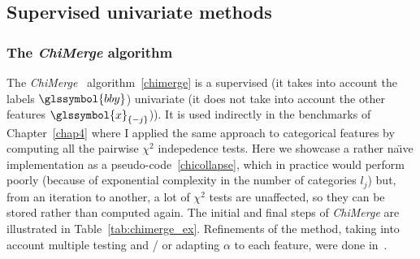 \subsection{Supervised univariate methods}

\subsubsection{The \textit{ChiMerge} algorithm}

The \textit{ChiMerge}~\cite{kerber1992chimerge} algorithm~\ref{chimerge} is a supervised (it takes into account the labels $\glssymbol{bby}$) univariate (it does not take into account the other features $\glssymbol{x}_{\{-j\}}$)). It is used indirectly in the benchmarks of Chapter~\ref{chap4} where I applied the same approach to categorical features by computing all the pairwise $\chi^2$ indepedence tests. Here we showcase a rather na\"{\i}ve implementation as a pseudo-code~\ref{chicollapse}, which in practice would perform poorly (because of exponential complexity in the number of categories $l_j$) but, from an iteration to another, a lot of $\chi^2$ tests are unaffected, so they can be stored rather than computed again. The initial and final steps of \textit{ChiMerge} are illustrated in Table~\ref{tab:chimerge_ex}. Refinements of the method, taking into account multiple testing and / or adapting $\alpha$ to each feature, were done in~\cite{liu1995chi2,wang1998concurrent,tay2002modified,su2005extended}.

%

